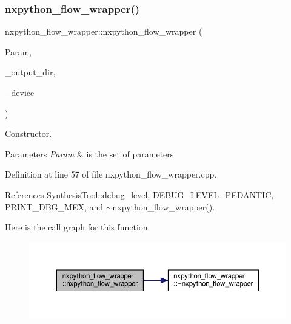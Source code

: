 \subsubsection{\texorpdfstring{nxpython\+\_\+flow\+\_\+wrapper()}{nxpython\_flow\_wrapper()}}
{\footnotesize\ttfamily nxpython\+\_\+flow\+\_\+wrapper\+::nxpython\+\_\+flow\+\_\+wrapper (\begin{DoxyParamCaption}\item[{const \hyperlink{Parameter_8hpp_a37841774a6fcb479b597fdf8955eb4ea}{Parameter\+Const\+Ref} \&}]{Param,  }\item[{const std\+::string \&}]{\+\_\+output\+\_\+dir,  }\item[{const \hyperlink{target__device_8hpp_acedb2b7a617e27e6354a8049fee44eda}{target\+\_\+device\+Ref} \&}]{\+\_\+device }\end{DoxyParamCaption})}



Constructor. 


\begin{DoxyParams}{Parameters}
{\em Param} & is the set of parameters \\
\hline
\end{DoxyParams}


Definition at line 57 of file nxpython\+\_\+flow\+\_\+wrapper.\+cpp.



References Synthesis\+Tool\+::debug\+\_\+level, D\+E\+B\+U\+G\+\_\+\+L\+E\+V\+E\+L\+\_\+\+P\+E\+D\+A\+N\+T\+IC, P\+R\+I\+N\+T\+\_\+\+D\+B\+G\+\_\+\+M\+EX, and $\sim$nxpython\+\_\+flow\+\_\+wrapper().

Here is the call graph for this function\+:
\nopagebreak
\begin{figure}[H]
\begin{center}
\leavevmode
\includegraphics[width=350pt]{df/d48/classnxpython__flow__wrapper_ac5dd3f918706d2613c4380a9504ecb63_cgraph}
\end{center}
\end{figure}
\mbox{\label{classnxpython__flow__wrapper_ace43b4bf45d41d51b46aa7504d4346c6}} 
